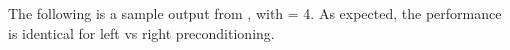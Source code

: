The following is a sample output from , with  = 4.
As expected, the performance is identical for left vs right preconditioning.


